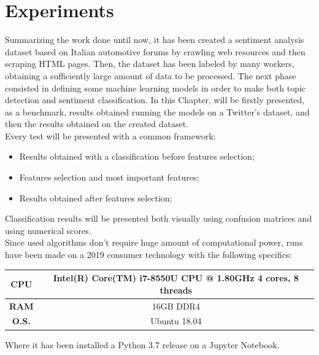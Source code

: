 
\chapter{Experiments}
\label{experiments}

Summarizing the work done until now, it has been created a sentiment analysis dataset based on Italian automotive forums by crawling web resources and then scraping HTML pages. Then, the dataset has been labeled by many workers, obtaining a sufficiently large amount of data to be processed. The next phase consisted in defining some machine learning models in order to make both topic detection and sentiment classification. In this Chapter, will be firstly presented, as a benchmark, results obtained running the models on a Twitter's dataset, and then the results obtained on the created dataset.\\
Every test will be presented with a common framework: 
\begin{itemize}
	\item Results obtained with a classification before features selection;
	\item Features selection and most important features;
	\item Results obtained after features selection;
\end{itemize}
Classification results will be presented both visually using confusion matrices and using numerical scores.\\
Since used algorithms don't require huge amount of computational power, runs have been made on a 2019 consumer technology with the following specifics:
\begin{center}
	\begin{tabular}{ |c||c| } 
		\hline
		\textbf{CPU} & Intel(R) Core(TM) i7-8550U CPU @ 1.80GHz 4 cores, 8 threads\\ 
		\hline
		\textbf{RAM} & 16GB DDR4 \\
		\hline
		\textbf{O.S.} & Ubuntu 18.04 \\
		\hline
	\end{tabular}
\end{center}
Where it has been installed a Python 3.7 release on a Jupyter Notebook.



